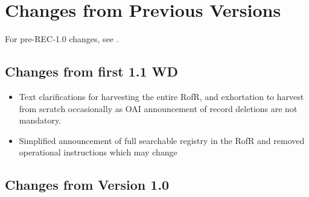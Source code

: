 \documentclass{ivoa}
\begin{document}


\section{Changes from Previous Versions}

\label{sect:changes}

For pre-REC-1.0 changes, see \citet{std:RI1}.

\subsection{Changes from first 1.1 WD}

\begin{itemize}

\item Text clarifications for harvesting the entire RofR, and 
exhortation to harvest from scratch occasionally as OAI 
announcement of record deletions are not mandatory.

\item Simplified announcement of full searchable registry
in the RofR and removed operational instructions which may change

\end{itemize}

\subsection{Changes from Version 1.0}

\label{changes-1.0}
\end{document}
